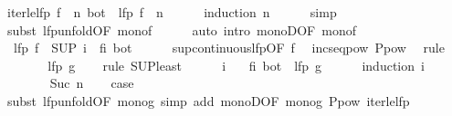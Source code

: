 \begin{isabellebody}
\ iter{\isacharunderscore}le{\isacharunderscore}lfp{\isacharcolon}\ {\isachardoublequoteopen}{\isacharparenleft}f\ {\isacharcircum}{\isacharcircum}\ n{\isacharparenright}\ bot\ {\isasymle}\ lfp\ f{\isachardoublequoteclose}\ \ n\isanewline
\ \ \ \ \isamarkupfalse%
\ {\isacharparenleft}induction\ n{\isacharparenright}\isanewline
\ \ \ \ \isamarkupfalse%
\ simp\isanewline
\ \ \ \ \isamarkupfalse%
\ {\isacharparenleft}subst\ lfp{\isacharunderscore}unfold{\isacharbrackleft}OF\ mono{\isacharunderscore}f{\isacharbrackright}{\isacharparenright}\isanewline
\ \ \ \ \isamarkupfalse%
\ {\isacharparenleft}auto\ intro{\isacharbang}{\isacharcolon}\ monoD{\isacharbrackleft}OF\ mono{\isacharunderscore}f{\isacharbrackright}{\isacharparenright}\isanewline
\ \ \ \ \isamarkupfalse%
\isanewline
\isanewline
\ \ \isamarkupfalse%
\ {\isachardoublequoteopen}{\isasymalpha}\ {\isacharparenleft}lfp\ f{\isacharparenright}\ {\isacharequal}\ {\isacharparenleft}SUP\ i{\isachardot}\ {\isasymalpha}\ {\isacharparenleft}{\isacharparenleft}f{\isacharcircum}{\isacharcircum}i{\isacharparenright}\ bot{\isacharparenright}{\isacharparenright}{\isachardoublequoteclose}\isanewline
\ \ \ \ \isamarkupfalse%
\ sup{\isacharunderscore}continuous{\isacharunderscore}lfp{\isacharbrackleft}OF\ f{\isacharbrackright}\ \isamarkupfalse%
\ incseq{\isacharunderscore}pow\ P{\isacharunderscore}pow\ \isamarkupfalse%
\ {\isacharparenleft}rule\ {\isasymalpha}{\isacharparenright}\isanewline
\ \ \isamarkupfalse%
\ \isamarkupfalse%
\ {\isachardoublequoteopen}{\isasymdots}\ {\isasymle}\ lfp\ g{\isachardoublequoteclose}\isanewline
\ \ \isamarkupfalse%
\ {\isacharparenleft}rule\ SUP{\isacharunderscore}least{\isacharparenright}\isanewline
\ \ \ \ \isamarkupfalse%
\ i\ \isamarkupfalse%
\ {\isachardoublequoteopen}{\isasymalpha}\ {\isacharparenleft}{\isacharparenleft}f{\isacharcircum}{\isacharcircum}i{\isacharparenright}\ bot{\isacharparenright}\ {\isasymle}\ lfp\ g{\isachardoublequoteclose}\isanewline
\ \ \ \ \isamarkupfalse%
\ {\isacharparenleft}induction\ i{\isacharparenright}\isanewline
\ \ \ \ \ \ \isamarkupfalse%
\ {\isacharparenleft}Suc\ n{\isacharparenright}\ \isamarkupfalse%
\ \isamarkupfalse%
\ {\isacharquery}case\isanewline
\ \ \ \ \ \ \ \ \isamarkupfalse%
\ {\isacharparenleft}subst\ lfp{\isacharunderscore}unfold{\isacharbrackleft}OF\ mono{\isacharunderscore}g{\isacharbrackright}{\isacharparenright}\ {\isacharparenleft}simp\ add{\isacharcolon}\ monoD{\isacharbrackleft}OF\ mono{\isacharunderscore}g{\isacharbrackright}\ P{\isacharunderscore}pow\ iter{\isacharunderscore}le{\isacharunderscore}lfp{\isacharparenright}\isanewline

\end{isabellebody}
